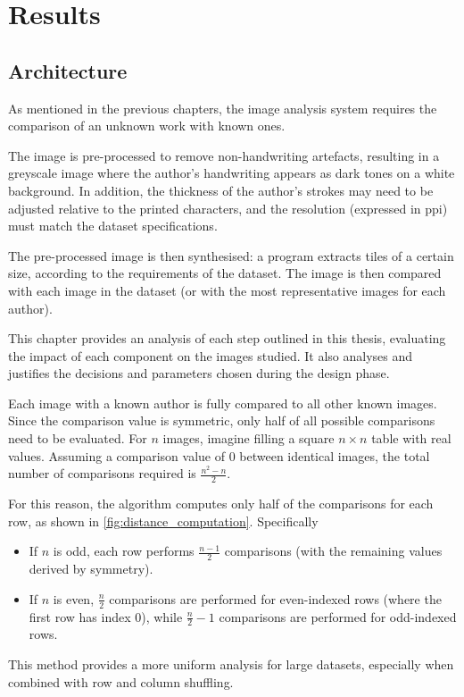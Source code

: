 \chapter{Results} \label{chap:results}
\begin{toReview}
\section{Architecture}
	As mentioned in the previous chapters, the image analysis system requires the comparison of an unknown work with known ones.

	\noindent The image is pre-processed to remove non-handwriting artefacts, resulting in a greyscale image where the author's handwriting appears as dark tones on a white background. In addition, the thickness of the author's strokes may need to be adjusted relative to the printed characters, and the resolution (expressed in \gls{ppi}) must match the dataset specifications.

	\noindent The pre-processed image is then synthesised: a program extracts tiles of a certain size, according to the requirements of the dataset. The image is then compared with each image in the dataset (or with the most representative images for each author).

	\noindent This chapter provides an analysis of each step outlined in this thesis, evaluating the impact of each component on the images studied. It also analyses and justifies the decisions and parameters chosen during the design phase.

	\bigskip
	\noindent Each image with a known author is fully compared to all other known images. Since the comparison value is symmetric, only half of all possible comparisons need to be evaluated. For $n$ images, imagine filling a square $n\times n$ table with real values. Assuming a comparison value of $0$ between identical images, the total number of comparisons required is $\frac{n^2-n}{2}$.

	\noindent For this reason, the algorithm computes only half of the comparisons for each row, as shown in \cref{fig:distance_computation}. Specifically
	\begin{itemize}
		\item If $n$ is odd, each row performs $\frac{n-1}{2}$ comparisons (with the remaining values derived by symmetry).
		\item If $n$ is even, $\frac{n}2$ comparisons are performed for even-indexed rows (where the first row has index $0$), while $\frac{n}2-1$ comparisons are performed for odd-indexed rows.
	\end{itemize}
	\noindent This method provides a more uniform analysis for large datasets, especially when combined with row and column shuffling.


\end{toReview}
